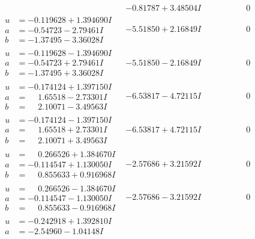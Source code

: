 \documentclass[1p]{elsarticle_modified}
\theoremstyle{definition}
\begin{document}
$$\begin{array}{c|c|c}
 & -0.81787 + 3.48504 I & \phantom{-0.000000 } 0 \\ \hline\begin{aligned}
u &= -0.119628 + 1.394690 I \\
a &= -0.54723 - 2.79461 I \\
b &= -1.37495 - 3.36028 I\end{aligned}
 & -5.51850 + 2.16849 I & \phantom{-0.000000 } 0 \\ \hline\begin{aligned}
u &= -0.119628 - 1.394690 I \\
a &= -0.54723 + 2.79461 I \\
b &= -1.37495 + 3.36028 I\end{aligned}
 & -5.51850 - 2.16849 I & \phantom{-0.000000 } 0 \\ \hline\begin{aligned}
u &= -0.174124 + 1.397150 I \\
a &= \phantom{-}1.65518 - 2.73301 I \\
b &= \phantom{-}2.10071 - 3.49563 I\end{aligned}
 & -6.53817 - 4.72115 I & \phantom{-0.000000 } 0 \\ \hline\begin{aligned}
u &= -0.174124 - 1.397150 I \\
a &= \phantom{-}1.65518 + 2.73301 I \\
b &= \phantom{-}2.10071 + 3.49563 I\end{aligned}
 & -6.53817 + 4.72115 I & \phantom{-0.000000 } 0 \\ \hline\begin{aligned}
u &= \phantom{-}0.266526 + 1.384670 I \\
a &= -0.114547 + 1.130050 I \\
b &= \phantom{-}0.855633 + 0.916968 I\end{aligned}
 & -2.57686 + 3.21592 I & \phantom{-0.000000 } 0 \\ \hline\begin{aligned}
u &= \phantom{-}0.266526 - 1.384670 I \\
a &= -0.114547 - 1.130050 I \\
b &= \phantom{-}0.855633 - 0.916968 I\end{aligned}
 & -2.57686 - 3.21592 I & \phantom{-0.000000 } 0 \\ \hline\begin{aligned}
u &= -0.242918 + 1.392810 I \\
a &= -2.54960 - 1.04148 I \\

\end{aligned}
\end{array}$$
\end{document}
